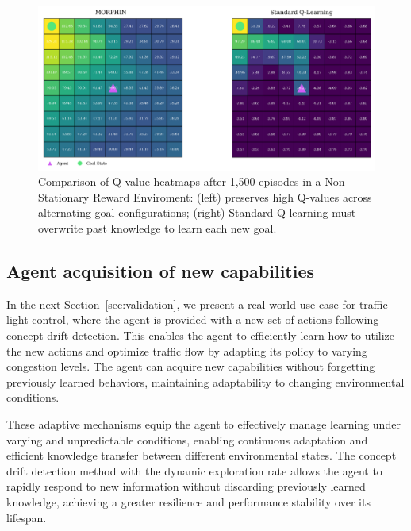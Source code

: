 \begin{figure}
    \centering
    \includegraphics[width=\textwidth]{figures/q_map_comp.png}
    \caption{Comparison of Q-value heatmaps after 1,500 episodes in a Non-Stationary Reward Enviroment: (left) \adaptiverl preserves high Q-values across alternating goal configurations; (right) Standard Q-learning must overwrite past knowledge to learn each new goal.}
    \label{fig:q-value-comp}
\end{figure}

\subsection{Agent acquisition of new capabilities}
In the next Section~\ref{sec:validation}, we present a real-world use case for traffic light control, where the agent is provided with a new set of actions following concept drift detection. This enables the agent to efficiently learn how to utilize the new actions and optimize traffic flow by adapting its policy to varying congestion levels. The agent can acquire new capabilities without forgetting previously learned behaviors, maintaining adaptability to changing environmental conditions.

These adaptive mechanisms equip the agent to effectively manage learning under varying and unpredictable conditions, enabling continuous adaptation and efficient knowledge transfer between different environmental states. The concept drift detection method with the dynamic exploration rate allows the agent to rapidly respond to new information without discarding previously learned knowledge, achieving a greater resilience and performance stability over its lifespan. 

\endinput

